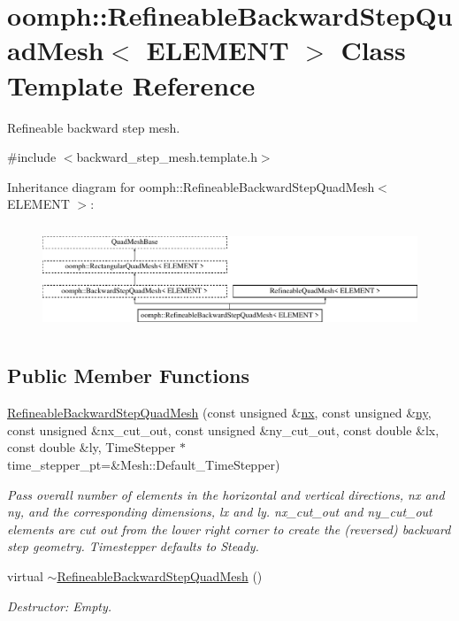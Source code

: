 \hypertarget{classoomph_1_1RefineableBackwardStepQuadMesh}{}\section{oomph\+:\+:Refineable\+Backward\+Step\+Quad\+Mesh$<$ E\+L\+E\+M\+E\+NT $>$ Class Template Reference}
\label{classoomph_1_1RefineableBackwardStepQuadMesh}


Refineable backward step mesh.  




{\ttfamily \#include $<$backward\+\_\+step\+\_\+mesh.\+template.\+h$>$}

Inheritance diagram for oomph\+:\+:Refineable\+Backward\+Step\+Quad\+Mesh$<$ E\+L\+E\+M\+E\+NT $>$\+:\begin{figure}[H]
\begin{center}
\leavevmode
\includegraphics[height=3.218391cm]{classoomph_1_1RefineableBackwardStepQuadMesh}
\end{center}
\end{figure}
\subsection*{Public Member Functions}
\begin{DoxyCompactItemize}
\item 
\hyperlink{classoomph_1_1RefineableBackwardStepQuadMesh_a0502cd96a9edc2789f9ddf6ec7b1d2ca}{Refineable\+Backward\+Step\+Quad\+Mesh} (const unsigned \&\hyperlink{classoomph_1_1RectangularQuadMesh_abfef93d6322886cdce14a437186e4821}{nx}, const unsigned \&\hyperlink{classoomph_1_1RectangularQuadMesh_a86d76a55eb7c4e8bca9b74d23c8b0412}{ny}, const unsigned \&nx\+\_\+cut\+\_\+out, const unsigned \&ny\+\_\+cut\+\_\+out, const double \&lx, const double \&ly, Time\+Stepper $\ast$time\+\_\+stepper\+\_\+pt=\&Mesh\+::\+Default\+\_\+\+Time\+Stepper)
\begin{DoxyCompactList}\small\item\em Pass overall number of elements in the horizontal and vertical directions, nx and ny, and the corresponding dimensions, lx and ly. nx\+\_\+cut\+\_\+out and ny\+\_\+cut\+\_\+out elements are cut out from the lower right corner to create the (reversed) backward step geometry. Timestepper defaults to Steady. \end{DoxyCompactList}\item 
virtual \hyperlink{classoomph_1_1RefineableBackwardStepQuadMesh_af30cb7d5ef893e64b184d540ed415e11}{$\sim$\+Refineable\+Backward\+Step\+Quad\+Mesh} ()
\begin{DoxyCompactList}\small\item\em Destructor\+: Empty. \end{DoxyCompactList}\end{DoxyCompactItemize}
